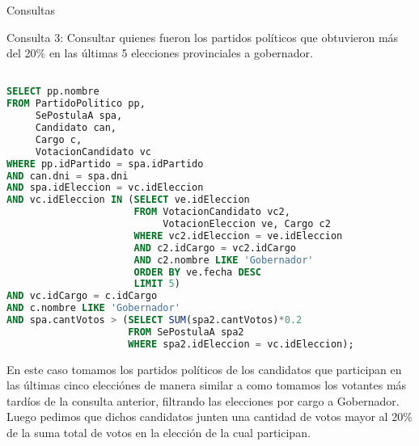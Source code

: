 \begin{section}{Consultas}
~

\noindent Consulta 3: Consultar quienes fueron los partidos pol\'iticos que obtuvieron m\'as del 20$\%$ en las \'ultimas 5 elecciones provinciales a gobernador.



\begin{lstlisting}[language=SQL, basicstyle=\footnotesize]

SELECT pp.nombre
FROM PartidoPolitico pp, 
     SePostulaA spa, 
     Candidato can, 
     Cargo c, 
     VotacionCandidato vc
WHERE pp.idPartido = spa.idPartido
AND can.dni = spa.dni
AND spa.idEleccion = vc.idEleccion
AND vc.idEleccion IN (SELECT ve.idEleccion
                      FROM VotacionCandidato vc2, 
                           VotacionEleccion ve, Cargo c2
                      WHERE vc2.idEleccion = ve.idEleccion
                      AND c2.idCargo = vc2.idCargo
                      AND c2.nombre LIKE 'Gobernador'
                      ORDER BY ve.fecha DESC
                      LIMIT 5)
AND vc.idCargo = c.idCargo
AND c.nombre LIKE 'Gobernador'
AND spa.cantVotos > (SELECT SUM(spa2.cantVotos)*0.2
                     FROM SePostulaA spa2
                     WHERE spa2.idEleccion = vc.idEleccion);
\end{lstlisting} 

En este caso tomamos los partidos pol\'iticos de los candidatos que participan en las \'ultimas cinco elecci\'ones de manera similar a como tomamos los votantes m\'as tard\'ios de la consulta anterior, filtrando las elecciones por cargo a Gobernador. Luego pedimos que dichos candidatos junten una cantidad de votos mayor al 20\% de la suma total de votos en la elecci\'on de la cual participan.

~ 


\end{section}
